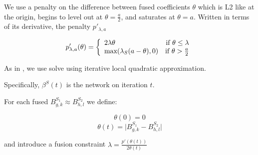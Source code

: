 \documentclass[11pt]{article}
\begin{document}
We use a penalty on the difference between fused coefficients $\theta$ which is L2 like at the origin, begins to level out at $\theta = \frac{a}{2}$, and saturates at $\theta = a$. Written in terms of its derivative, the penalty $p'_{\lambda, a}$

\begin{equation}
p'_{\lambda,a}(\theta) = \left\{
    \begin{array}{lr}
    2\lambda\theta & \text{if } \theta \leq \lambda\\
    \text{max}(\lambda_S(a-\theta),0) & \text{if } \theta > {a \over 2}
    \end{array}
    \right.
\end{equation}





As in \cite{fan2001variable}, we use solve using iterative local quadratic approximation. 

Specifically, $\beta^S(t)$ is the network on iteration $t$. 

For each fused $B^{S_1}_{g,k} \approx B^{S_2}_{h,l}$ we define:

\begin{equation} 
\theta(0)=0
\end{equation}
\begin{equation}
\theta(t) = \vert B^{S_1}_{g,k} - B^{S_2}_{h,l} \vert
\end{equation}

and introduce a fusion constraint $\lambda = \frac{p'(\theta(t))}{2\theta(t)} $
\end{document}
